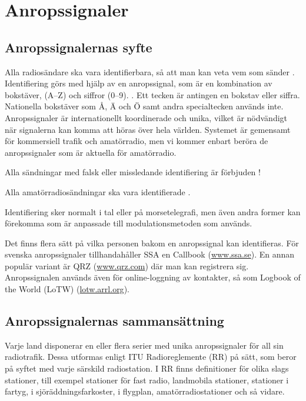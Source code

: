 \section{Anropssignaler}

\subsection{Anropssignalernas syfte}

Alla radiosändare ska vara identifierbara, så att man kan veta vem
som sänder \cite[\S19.1]{ITU-RR}.
Identifiering görs med hjälp av en anropssignal, som är en kombination av bokstäver, (A--Z) och siffror (0--9). \cite[\S19.45]{ITU-RR}.
Ett tecken är antingen en bokstav eller siffra. Nationella bokstäver som Å, Ä och Ö samt andra specialtecken används inte.
Anropssignaler är internationellt koordinerade och unika, vilket är nödvändigt
när signalerna kan komma att höras över hela världen.
Systemet är gemensamt för kommersiell trafik och amatörradio, men vi kommer
enbart beröra de anropssignaler som är aktuella för amatörradio.

Alla sändningar med falsk eller missledande identifiering är förbjuden
\cite[\S19.2]{ITU-RR}!

Alla amatörradiosändningar ska vara identifierade \cite[\S19.4, \S19.5]{ITU-RR}.

Identifiering sker normalt i tal eller på morsetelegrafi, men även andra former
kan förekomma som är anpassade till modulationsmetoden som används.

Det finns flera sätt på vilka personen bakom en anropssignal kan identifieras.
För svenska anropssignaler tillhandahåller SSA en Callbook
(\href{http://www.ssa.se/}{www.ssa.se}).
En annan populär variant är QRZ (\href{https://www.qrz.com/}{www.qrz.com}) där
man kan registrera sig.
Anropssignalen används även för online-loggning av kontakter, så som
Logbook of the World (LoTW) (\href{https://lotw.arrl.org/}{lotw.arrl.org}).

\subsection{Anropssignalernas sammansättning}

Varje land disponerar en eller flera serier med unika anropssignaler för all
sin radiotrafik.
Dessa utformas enligt ITU Radioreglemente (RR) \cite[\S19]{ITU-RR} på sätt,
som beror på syftet med varje särskild radiostation.
I RR finns definitioner för olika slags stationer, till exempel stationer för fast
radio, landmobila stationer, stationer i fartyg, i sjöräddningsfarkoster,
i flygplan, amatörradiostationer och så vidare.

